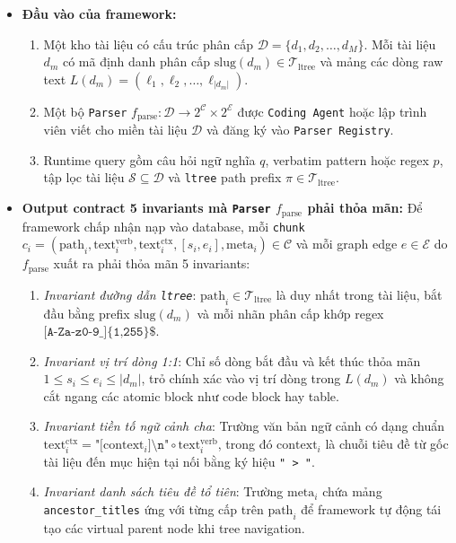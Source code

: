 \begin{itemize}
    \item \textbf{Đầu vào của framework:}
    \begin{enumerate}
        \item Một kho tài liệu có cấu trúc phân cấp $\mathcal{D} = \{d_1, d_2, \dots, d_M\}$. Mỗi tài liệu $d_m$ có mã định danh phân cấp $\text{slug}(d_m) \in \mathcal{T}_{\text{ltree}}$ và mảng các dòng raw text $L(d_m) = (\ell_1, \ell_2, \dots, \ell_{|d_m|})$.
        \item Một bộ \texttt{Parser} $f_{\text{parse}}: \mathcal{D} \rightarrow 2^{\mathcal{C}} \times 2^{\mathcal{E}}$ được \texttt{Coding Agent} hoặc lập trình viên viết cho miền tài liệu $\mathcal{D}$ và đăng ký vào \texttt{Parser Registry}.
        \item Runtime query gồm câu hỏi ngữ nghĩa $q$, verbatim pattern hoặc regex $p$, tập lọc tài liệu $\mathcal{S} \subseteq \mathcal{D}$ và \texttt{ltree} path prefix $\pi \in \mathcal{T}_{\text{ltree}}$.
    \end{enumerate}
    \item \textbf{Output contract 5 invariants mà \texttt{Parser} $f_{\text{parse}}$ phải thỏa mãn:}
    Để framework chấp nhận nạp vào database, mỗi \texttt{chunk} $c_i = (\text{path}_i, \text{text}^{\text{verb}}_i, \text{text}^{\text{ctx}}_i, [s_i, e_i], \text{meta}_i) \in \mathcal{C}$ và mỗi graph edge $e \in \mathcal{E}$ do $f_{\text{parse}}$ xuất ra phải thỏa mãn 5 invariants:
    \begin{enumerate}
        \item \textit{Invariant đường dẫn \texttt{ltree}}: $\text{path}_i \in \mathcal{T}_{\text{ltree}}$ là duy nhất trong tài liệu, bắt đầu bằng prefix $\text{slug}(d_m)$ và mỗi nhãn phân cấp khớp regex $\texttt{\^{}[A-Za-z0-9\_]\{1,255\}\$}$.
        \item \textit{Invariant vị trí dòng 1:1}: Chỉ số dòng bắt đầu và kết thúc thỏa mãn $1 \le s_i \le e_i \le |d_m|$, trỏ chính xác vào vị trí dòng trong $L(d_m)$ và không cắt ngang các atomic block như code block hay table.
        \item \textit{Invariant tiền tố ngữ cảnh cha}: Trường văn bản ngữ cảnh có dạng chuẩn $\text{text}^{\text{ctx}}_i = \texttt{"[}\text{context}_i\texttt{]\textbackslash n"} \circ \text{text}^{\text{verb}}_i$, trong đó $\text{context}_i$ là chuỗi tiêu đề từ gốc tài liệu đến mục hiện tại nối bằng ký hiệu \texttt{" > "}.
        \item \textit{Invariant danh sách tiêu đề tổ tiên}: Trường $\text{meta}_i$ chứa mảng \texttt{ancestor\_titles} ứng với từng cấp trên $\text{path}_i$ để framework tự động tái tạo các virtual parent node khi tree navigation.

\end{enumerate}
\end{itemize}
